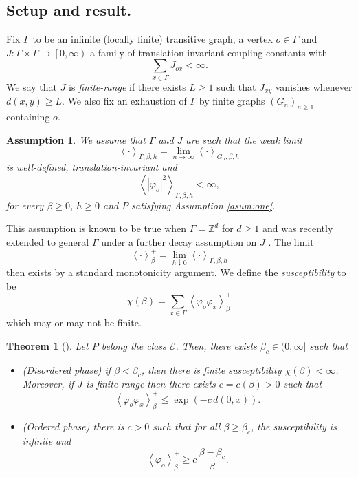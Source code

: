 \documentclass{article}
\newtheorem{theorem}{Theorem}
\newtheorem{asum}[]{Assumption}
\numberwithin{equation}{section}
\theoremstyle{definition}
\theoremstyle{definition}
\theoremstyle{remark}
\newcommand\vp{\varphi}
\newcommand\Ec{\mathcal{E}}
\newcommand{\Z}{\mathbb{Z}}
\newcommand{\G}{\Gamma}
\begin{document}
\subsection{Setup and result. }Fix $\Gamma$ to be an infinite (locally finite) transitive graph, a vertex $o \in \G$ and $J : \G \times \G \to \left[0,\infty\right)$ a family of translation-invariant coupling constants with
\begin{equation}\label{eq:Jasum}
	\sum_{x \in \G} J_{ox} < \infty.
\end{equation} 
We say that $J$ is \emph{finite-range} if there exists $L \geq 1$ such that $J_{xy}$ vanishes whenever $d(x,y) \geq L$.
We also fix an exhaustion of $\G$ by finite graphs $(G_n)_{n \geq 1}$ containing $o$.  
\begin{asum}\label{asum:two}
	We assume that $\G$ and $J$ are such that the weak limit
	\[
	\left< \cdot \right>_{\G,\beta,h} = \lim_{n \to \infty}  \left< \cdot \right>_{G_n,\beta,h} 
	\] 
	is well-defined, translation-invariant and
	\[
		\left< |\vp_o|^2 \right>_{\G,\beta,h} < \infty,
	\]
	for every $\beta \geq 0$, $h \geq 0$ and $P$ satisfying Assumption \ref{asum:one}.
\end{asum}
This assumption is known to be true when $\G = \Z^d$ for $d \geq 1$ \cite{ruelle1976probability, lebowitz1976statistical} and was recently extended to general $\G$ under a further decay assumption on $J$ \cite{panagiotis2026regularity}. 
The limit
\[
	\left< \cdot \right>^{+}_\beta = \lim_{h \downarrow 0}  \left< \cdot \right>_{\G,\beta,h} 
\] 
then exists by a standard monotonicity argument.
We define the \emph{susceptibility} to be
\[
	\chi(\beta) = \sum_{x \in \G} \left< \vp_o \vp_x \right>^+_{\beta}
\] 
which may or may not be finite. 
\begin{theorem}[]\label{thm:sharpness}
	Let $P$ belong the class $\Ec$. Then, there exists $\beta_c \in (0,\infty]$ such that
	\begin{itemize}
		\item (Disordered phase) if $\beta < \beta_c$, then there is finite susceptibility $\chi(\beta) < \infty$. Moreover, if $J$ is finite-range then there exists $c = c(\beta) > 0$ such that
			\[
			\left< \vp_o \vp_x \right>_{\beta}^+ \leq \exp( - c \, d(0,x)).
			\] 
		\item (Ordered phase) there is $c > 0$ such that for all $\beta \geq \beta_c$, the susceptibility is infinite and
			\begin{equation}\label{eq:exponent}
			\left< \vp_o \right>_{\beta}^+ \geq c  \,\frac{\beta - \beta_c}{\beta}.
			\end{equation} 
	\end{itemize}
\end{theorem}
\end{document}
